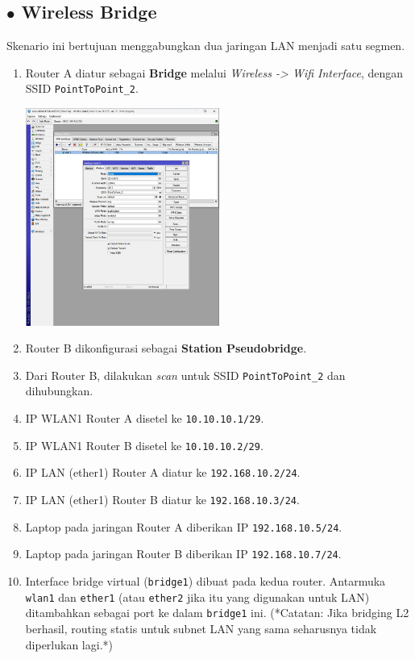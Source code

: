 \subsection*{$\bullet$ Wireless Bridge}
Skenario ini bertujuan menggabungkan dua jaringan LAN menjadi satu segmen.
\begin{enumerate}
    \item Router A diatur sebagai \textbf{Bridge} melalui \textit{Wireless -> Wifi Interface}, dengan SSID \texttt{PointToPoint\_2}.
    \begin{center}
        \includegraphics[width=0.5\textwidth]{img/bridge.jpg} %
    \end{center}
    \item Router B dikonfigurasi sebagai \textbf{Station Pseudobridge}.
    \item Dari Router B, dilakukan \textit{scan} untuk SSID \texttt{PointToPoint\_2} dan dihubungkan.
    \item IP WLAN1 Router A disetel ke \texttt{10.10.10.1/29}.
    \item IP WLAN1 Router B disetel ke \texttt{10.10.10.2/29}.
    \item IP LAN (ether1) Router A diatur ke \texttt{192.168.10.2/24}. %
    \item IP LAN (ether1) Router B diatur ke \texttt{192.168.10.3/24}. %
    \item Laptop pada jaringan Router A diberikan IP \texttt{192.168.10.5/24}.
    \item Laptop pada jaringan Router B diberikan IP \texttt{192.168.10.7/24}.
    \item Interface bridge virtual (\texttt{bridge1}) dibuat pada kedua router. Antarmuka \texttt{wlan1} dan \texttt{ether1} (atau \texttt{ether2} jika itu yang digunakan untuk LAN) ditambahkan sebagai port ke dalam \texttt{bridge1} ini. (*Catatan: Jika bridging L2 berhasil, routing statis untuk subnet LAN yang sama seharusnya tidak diperlukan lagi.*)

\end{enumerate}
